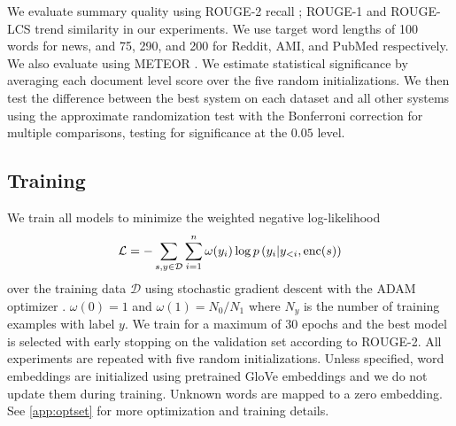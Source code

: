 
We evaluate summary quality using ROUGE-2 recall \cite{lin2004rouge};
ROUGE-1 and ROUGE-LCS trend similarity in our experiments.
We use target word lengths of 100 words for news, and 
75, 290, and 200 for Reddit, AMI, and PubMed respectively.
We also evaluate using METEOR \cite{denkowski:lavie:meteor-wmt:2014}.
We estimate statistical significance by averaging each document level score
over the five random initializations.
We then test the difference between the best system on each dataset and 
all other systems using the approximate randomization test 
\cite{riezler2005some} with the Bonferroni correction for multiple comparisons,
testing for significance at the $0.05$ level. 

\subsection{Training}

We train all models to minimize the weighted negative log-likelihood
\[\mathcal{L} = -\sum_{s,y\in \mathcal{D}} \sum_{i=1}^\docSize \omega(y_i) \log p\left(y_i|y_{<i},
\operatorname{enc}(\sent)\right)\]
over the training data $\mathcal{D}$
using stochastic gradient descent with the ADAM optimizer
\cite{kingma2014adam}.
$\omega(0)=1$ and $\omega(1) = N_0/N_1$ where $N_y$ is the number of 
training examples with label $y$.
    We train for a maximum of 30 epochs and the best
    model is selected with early stopping on the validation set according
    to ROUGE-2. All experiments are repeated with five random
    initializations.     Unless specified, word embeddings are initialized 
    using pretrained GloVe embeddings \cite{pennington2014glove} and we do 
    not update them during training. Unknown words are mapped to a zero 
    embedding.
    See \autoref{app:optset} for more optimization and training details.

